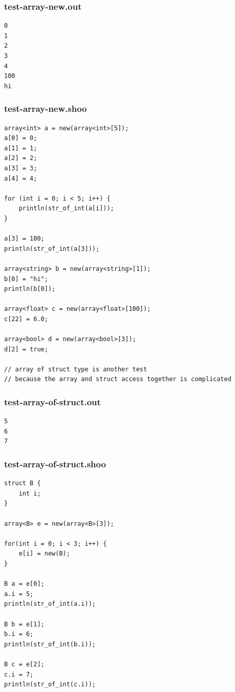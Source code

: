 \documentclass[12pt]{article}
\begin{document}
\subsubsection{test-array-new.out}
\begin{mdframed}[hidealllines=true,backgroundcolor=green!10]
\begin{lstlisting}
0
1
2
3
4
100
hi
\end{lstlisting}
\end{mdframed}
\subsubsection{test-array-new.shoo}
\begin{mdframed}[hidealllines=true,backgroundcolor=blue!10]
\begin{lstlisting}
array<int> a = new(array<int>[5]);
a[0] = 0;
a[1] = 1;
a[2] = 2;
a[3] = 3;
a[4] = 4;

for (int i = 0; i < 5; i++) {
    println(str_of_int(a[i]));
}

a[3] = 100;
println(str_of_int(a[3]));

array<string> b = new(array<string>[1]);
b[0] = "hi";
println(b[0]);

array<float> c = new(array<float>[100]);
c[22] = 6.0;

array<bool> d = new(array<bool>[3]);
d[2] = true;

// array of struct type is another test
// because the array and struct access together is complicated
\end{lstlisting}
\end{mdframed}
\subsubsection{test-array-of-struct.out}
\begin{mdframed}[hidealllines=true,backgroundcolor=green!10]
\begin{lstlisting}
5
6
7
\end{lstlisting}
\end{mdframed}
\subsubsection{test-array-of-struct.shoo}
\begin{mdframed}[hidealllines=true,backgroundcolor=blue!10]
\begin{lstlisting}
struct B {
    int i;
}

array<B> e = new(array<B>[3]);

for(int i = 0; i < 3; i++) {
    e[i] = new(B);
}

B a = e[0];
a.i = 5;
println(str_of_int(a.i));

B b = e[1];
b.i = 6;
println(str_of_int(b.i));

B c = e[2];
c.i = 7;
println(str_of_int(c.i));
\end{lstlisting}
\end{mdframed}
\end{document}
